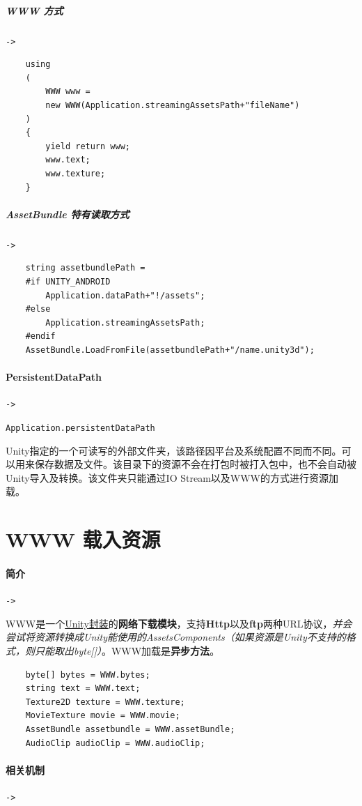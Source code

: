 \documentclass[UTF8,a4paper,12pt]{ctexbook}
\begin{document}
				\subparagraph{WWW 方式}\verb|->|
					\begin{lstlisting}
	using
	(
		WWW www = 
		new WWW(Application.streamingAssetsPath+"fileName")
	) 
	{ 
		yield return www; 
		www.text; 
		www.texture; 
	} 
					\end{lstlisting}
				
				\subparagraph{AssetBundle 特有读取方式}\verb|->|
					\begin{lstlisting}
	string assetbundlePath = 
	#if UNITY_ANDROID 
		Application.dataPath+"!/assets"; 
	#else 
		Application.streamingAssetsPath; 
	#endif  
	AssetBundle.LoadFromFile(assetbundlePath+"/name.unity3d"); 
					\end{lstlisting}
					
			\paragraph{PersistentDataPath}\verb|->|
			
				\verb|Application.persistentDataPath |
				
				Unity指定的一个可读写的外部文件夹，该路径因平台及系统配置不同而不同。可以用来保存数据及文件。该目录下的资源不会在打包时被打入包中，也不会自动被Unity导入及转换。该文件夹只能通过IO Stream以及WWW的方式进行资源加载。
			
	\section{WWW 载入资源}
		\paragraph{简介}\verb|->|
			
			 WWW是一个\underline{Unity封装}的\textbf{网络下载模块}，支持\textbf{Http}以及\textbf{ftp}两种URL协议，\textit{并会尝试将资源转换成Unity能使用的AssetsComponents（如果资源是Unity不支持的格式，则只能取出byte[]）}。WWW加载是\textbf{异步方法}。
				\begin{lstlisting}
	byte[] bytes = WWW.bytes; 
	string text = WWW.text; 
	Texture2D texture = WWW.texture; 
	MovieTexture movie = WWW.movie; 
	AssetBundle assetbundle = WWW.assetBundle; 
	AudioClip audioClip = WWW.audioClip; 
				\end{lstlisting}
			
		\paragraph{相关机制}\verb|->|
			
\end{document}
